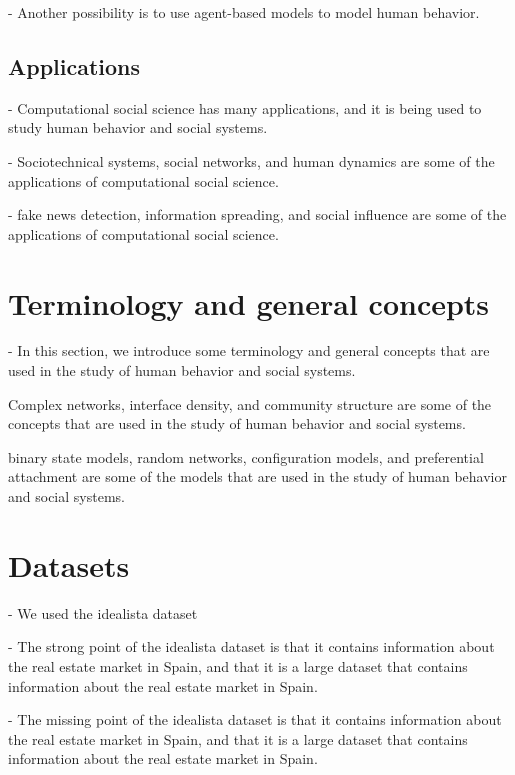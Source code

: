 - Another possibility is to use agent-based models to model human behavior.

\subsection{\label{subsec:Applications} Applications}

- Computational social science has many applications, and it is being used to study human behavior and social systems.

- Sociotechnical systems, social networks, and human dynamics are some of the applications of computational social science.

- fake news detection, information spreading, and social influence are some of the applications of computational social science.

\section{\label{sec:Terminology and general concepts} Terminology and general concepts}

- In this section, we introduce some terminology and general concepts that are used in the study of human behavior and social systems.

Complex networks, interface density, and community structure are some of the concepts that are used in the study of human behavior and social systems.

binary state models, random networks, configuration models, and preferential attachment are some of the models that are used in the study of human behavior and social systems.

\section{\label{sec:Datasets} Datasets}

- We used the idealista dataset

- The strong point of the idealista dataset is that it contains information about the real estate market in Spain, and that it is a large dataset that contains information about the real estate market in Spain.

- The missing point of the idealista dataset is that it contains information about the real estate market in Spain, and that it is a large dataset that contains information about the real estate market in Spain.
